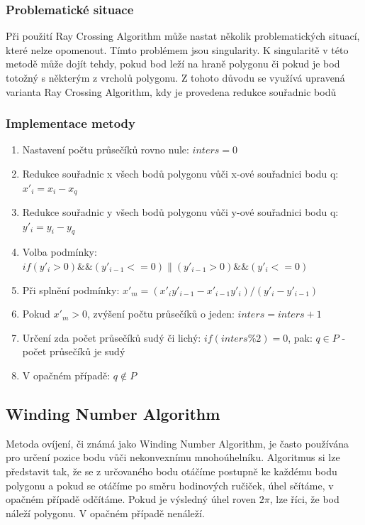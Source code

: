 \documentclass[a4paper, 12pt]{article}
\begin{document}
\subsubsection{Problematické situace}
Při použití Ray Crossing Algorithm může nastat několik problematických situací, které nelze opomenout. Tímto problémem jsou singularity. K singularitě v této metodě může dojít tehdy, pokud bod leží na hraně polygonu či pokud je bod totožný s některým z vrcholů polygonu. Z tohoto důvodu se využívá upravená varianta Ray Crossing Algorithm, kdy je provedena redukce souřadnic bodů 

\subsubsection{Implementace metody}
\begin{enumerate}
\item Nastavení počtu průsečíků rovno nule:  $ inters = 0 $ 
\item Redukce souřadnic x všech bodů polygonu vůči x-ové souřadnici bodu q:  $x'_i = x_i - x_q $ 
\item Redukce souřadnic y všech bodů polygonu vůči y-ové souřadnici bodu q:  $y'_i = y_i - y_q $ 
\item Volba podmínky:  $if(y'_i > 0)\&\&(y'_{i-1} <= 0)\|(y'_{i-1} > 0)\&\&(y'_{i} <= 0)  $ 
\item Při splnění podmínky:  $ x'_m = (x'_i y'_{i-1} - x'_{i-1} y'_i ) / (y'_i - y'_{i-1})$ 
\item Pokud $x'_m > 0$, zvýšení počtu průsečíků o jeden: $ inters = inters + 1 $
\item Určení zda počet průsečíků sudý či lichý: $if (inters\%2) = 0$, pak: $q\in P$ - počet průsečíků je sudý
\item V opačném případě: $q {\not \in} P$
\end{enumerate}

\subsection{Winding Number Algorithm}
Metoda ovíjení, či známá jako Winding Number Algorithm, je často používána pro určení pozice bodu vůči nekonvexnímu mnohoúhelníku. Algoritmus si lze představit tak, že se z určovaného bodu otáčíme postupně ke každému bodu polygonu a pokud se otáčíme po směru hodinových ručiček, úhel sčítáme, v opačném případě odčítáme. Pokud je výsledný úhel roven $2\pi$, lze říci, že bod náleží polygonu. V opačném případě nenáleží.
\end{document}
